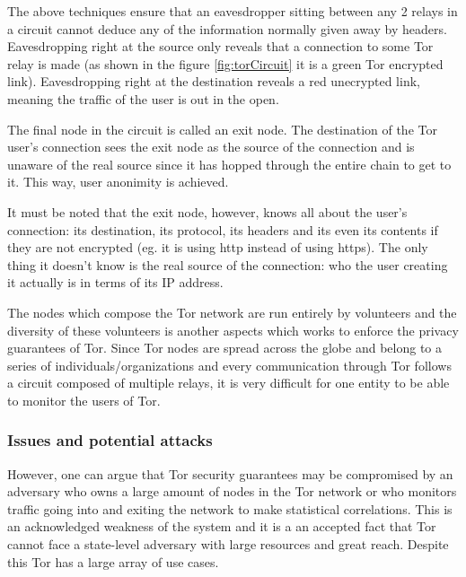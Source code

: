 \documentclass[11pt]{book} %
\begin{document}
The above techniques ensure that an eavesdropper sitting between any 2 relays in a circuit cannot deduce any of the information normally given away by headers. Eavesdropping right at the source  only reveals that a connection to some Tor relay is made (as shown in the figure \ref{fig:torCircuit} it is a green Tor encrypted link). Eavesdropping right at the destination reveals a red unecrypted link, meaning the traffic of the user is out in the open.


The final node in the circuit is called an exit node. The destination of the Tor user's connection sees the exit node as the source of the connection and is unaware of the real source since it has hopped through the entire chain to get to it. This way, user anonimity is achieved.

It must be noted that the exit node, however, knows all about the user's connection: its destination, its protocol, its headers and its even its contents if they are not encrypted (eg. it is using http instead of using https). The only thing it doesn't know is the real source of the connection: who the user creating it actually is in terms of its IP address. 


The nodes which compose the Tor network are run entirely by volunteers and the diversity of these volunteers is another aspects which works to enforce the privacy guarantees of Tor. Since Tor nodes are spread across the globe and belong to a series of individuals/organizations and every communication through Tor follows a circuit composed of multiple relays, it is very difficult for one entity to be able to monitor the users of Tor.

\subsubsection{Issues and potential attacks}

However, one can argue that Tor security guarantees may be compromised by an adversary who owns a large amount of nodes in the Tor network or who monitors traffic going into and exiting the network to make statistical correlations. This is an acknowledged weakness of the system and it is a an accepted fact that Tor cannot face a state-level adversary with large resources and great reach. Despite this Tor has a large array of use cases.
\end{document}

